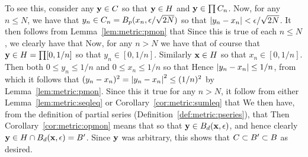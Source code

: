 {{    To see this, consider any $\vy \in C$ so that $\vy \in H$ and $\vy \in \prod C_n$.
    Now, for any $n \leq N$, we have that $y_n \in C_n = B_p(x_n, \e/\sqrt{2N})$ so that $\abs{y_n - x_n} < \e/\sqrt{2N}$.
    It then follows from Lemma~\ref{lem:metric:pmon} that
    Since this is true of each $n \leq N$, we clearly have that
    Now, for any $n > N$ we have that of course that $\vy \in H = \prod [0, 1/n]$ so that $y_n \in [0, 1/n]$.
    Similarly $\vx \in H$ so that $x_n \in [0,1/n]$.
    Then both $0 \leq y_n \leq 1/n$ and $0 \leq x_n \leq 1/n$ so that
    Hence $\abs{y_n - x_n} \leq 1/n$, from which it follows that $(y_n-x_n)^2 = \abs{y_n-x_n}^2 \leq (1/n)^2$ by Lemma~\ref{lem:metric:pmon}.
    Since this it true for any $n > N$, it follow from either Lemma~\ref{lem:metric:seqleq} or Corollary~\ref{cor:metric:sumleq} that
    We then have, from the definition of partial series (Definition~\ref{def:metric:pseries}), that
    Then Corollary~\ref{cor:metric:opmon} means that
    so that $\vy \in B_d(\vx, \e)$, and hence clearly $\vy \in H \cap B_d(\vx, \e) = B'$.
    Since $\vy$ was arbitrary, this shows that $C \ss B' \ss B$ as desired.
  }
}

